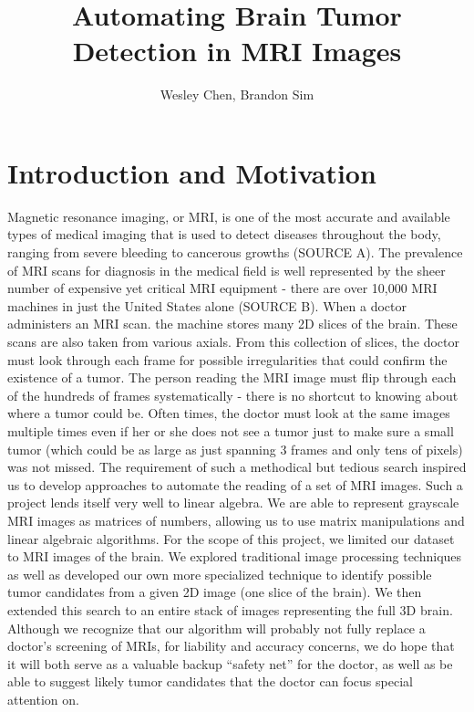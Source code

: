 \documentclass[12pt]{article}
\theoremstyle{plain}%
\theoremstyle{definition}
\theoremstyle{remark}
\begin{document}
\title{Automating Brain Tumor Detection in MRI Images}
\author{Wesley Chen, Brandon Sim}

\maketitle
\tableofcontents
\newpage

\section{Introduction and Motivation}

Magnetic resonance imaging, or MRI, is one of the most accurate and available types of medical imaging that is used to detect diseases throughout the body, ranging from severe bleeding to cancerous growths (SOURCE A).  The prevalence of MRI scans for diagnosis in the medical field is well represented by the sheer number of expensive yet critical MRI equipment - there are over 10,000 MRI machines in just the United States alone (SOURCE B).  When a doctor administers an MRI scan. the machine stores many 2D slices of the brain. These scans are also taken from various axials. From this collection of slices, the doctor must look through each frame for possible irregularities that could confirm the existence of a tumor.  The person reading the MRI image must flip through each of the hundreds of frames systematically - there is no shortcut to knowing about where a tumor could be.  Often times, the doctor must look at the same images multiple times even if her or she does not see a tumor just to make sure a small tumor (which could be as large as just spanning 3 frames and only tens of pixels) was not missed.  The requirement of such a methodical but tedious search inspired us to develop approaches to automate the reading of a set of MRI images. Such a project lends itself very well to linear algebra. We are able to represent grayscale MRI images as matrices of numbers, allowing us to use matrix manipulations and linear algebraic algorithms. For the scope of this project, we limited our dataset to MRI images of the brain. We explored traditional image processing techniques as well as developed our own more specialized technique to identify possible tumor candidates from a given 2D image (one slice of the brain). We then extended this search to an entire stack of images representing the full 3D brain. Although we recognize that our algorithm will probably not fully replace a doctor's screening of MRIs, for liability and accuracy concerns, we do hope that it will both serve as a valuable backup ``safety net'' for the doctor, as well as be able to suggest likely tumor candidates that the doctor can focus special attention on.
\end{document}
